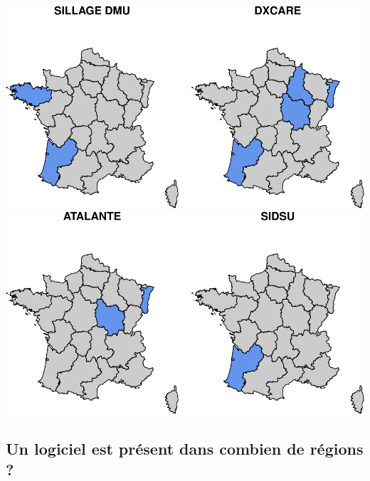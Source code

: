 \documentclass[]{article}
\begin{document}
\includegraphics{septembre2015_files/figure-latex/unnamed-chunk-6-3.pdf}
\includegraphics{septembre2015_files/figure-latex/unnamed-chunk-6-4.pdf}

\subsection{Un logiciel est présent dans combien de régions
?}\label{un-logiciel-est-present-dans-combien-de-regions}
\end{document}
